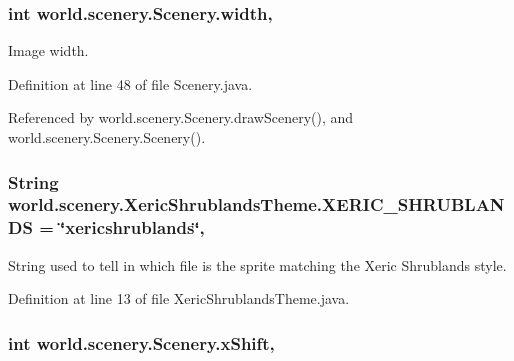 \hypertarget{a00024_ad10b27080954e2fc06aa1718f47c4ce1}{
\subsubsection[{width}]{\setlength{\rightskip}{0pt plus 5cm}int world.\-scenery.\-Scenery.\-width\hspace{0.3cm}{\ttfamily [protected]}, {\ttfamily [inherited]}}}\label{a00024_ad10b27080954e2fc06aa1718f47c4ce1}


Image width. 



Definition at line 48 of file Scenery.\-java.



Referenced by world.\-scenery.\-Scenery.\-draw\-Scenery(), and world.\-scenery.\-Scenery.\-Scenery().

\hypertarget{a00040_a03cab029cbad9fdfa722122d3393c06c}{
\subsubsection[{X\-E\-R\-I\-C\-\_\-\-S\-H\-R\-U\-B\-L\-A\-N\-D\-S}]{\setlength{\rightskip}{0pt plus 5cm}String world.\-scenery.\-Xeric\-Shrublands\-Theme.\-X\-E\-R\-I\-C\-\_\-\-S\-H\-R\-U\-B\-L\-A\-N\-D\-S = \char`\"{}xericshrublands\char`\"{}\hspace{0.3cm}{\ttfamily [static]}, {\ttfamily [inherited]}}}\label{a00040_a03cab029cbad9fdfa722122d3393c06c}


String used to tell in which file is the sprite matching the Xeric Shrublands style. 



Definition at line 13 of file Xeric\-Shrublands\-Theme.\-java.

\hypertarget{a00024_a0999f105f7630fd67fd9d440da6983aa}{
\subsubsection[{x\-Shift}]{\setlength{\rightskip}{0pt plus 5cm}int world.\-scenery.\-Scenery.\-x\-Shift\hspace{0.3cm}{\ttfamily [protected]}, {\ttfamily [inherited]}}}\label{a00024_a0999f105f7630fd67fd9d440da6983aa}


